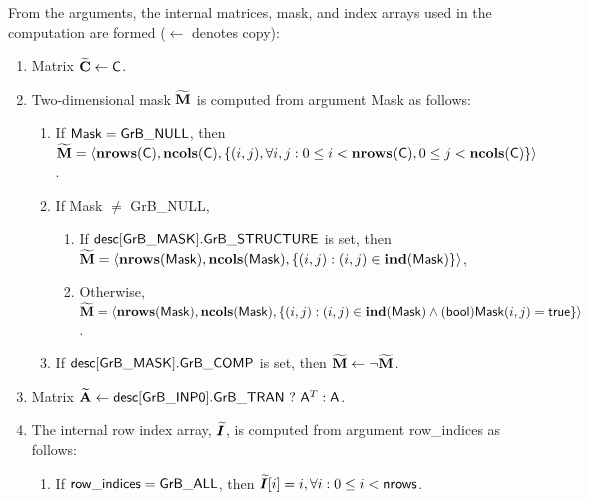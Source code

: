 From the arguments, the internal matrices, mask, and index arrays used in 
the computation are formed ($\leftarrow$ denotes copy):
\begin{enumerate}
	\item Matrix ${\bf \widetilde{C}} \leftarrow {\sf C}$.

	\item Two-dimensional mask ${\bf \widetilde{M}}$ is computed from
    argument {\sf Mask} as follows:
	\begin{enumerate}
		\item If ${\sf Mask} = {\sf GrB\_NULL}$, then ${\bf \widetilde{M}} = 
        \langle \bold{nrows}({\sf C}), \bold{ncols}({\sf C}), \{(i,j), 
        \forall i,j : 0 \leq i <  \bold{nrows}({\sf C}), 0 \leq j < 
        \bold{ncols}({\sf C}) \} \rangle$.

		\item If {\sf Mask} $\ne$ {\sf GrB\_NULL},
        \begin{enumerate}
            \item If ${\sf desc[GrB\_MASK].GrB\_STRUCTURE}$ is set, then 
            ${\bf \widetilde{M}} = \langle \bold{nrows}({\sf Mask}), 
            \bold{ncols}({\sf Mask}), \{(i,j) : (i,j) \in \bold{ind}({\sf Mask}) \} \rangle$,
            \item Otherwise, ${\bf \widetilde{M}} = \langle \bold{nrows}({\sf Mask}), 
            \bold{ncols}({\sf Mask}), \\ \{(i,j) : (i,j) \in \bold{ind}({\sf Mask}) \wedge 
            ({\sf bool}){\sf Mask}(i,j) = {\sf true}\} \rangle$.
        \end{enumerate}

		\item	If ${\sf desc[GrB\_MASK].GrB\_COMP}$ is set, then 
        ${\bf \widetilde{M}} \leftarrow \neg {\bf \widetilde{M}}$.
	\end{enumerate}

	\item Matrix ${\bf \widetilde{A}} \leftarrow
    {\sf desc[GrB\_INP0].GrB\_TRAN} \ ? \ {\sf A}^T : {\sf A}$.

    \item The internal row index array, $\bm{\widetilde{I}}$, is computed from 
    argument {\sf row\_indices} as follows:
	\begin{enumerate}
		\item	If ${\sf row\_indices} = {\sf GrB\_ALL}$, then 
        $\bm{\widetilde{I}}[i] = i, \forall i : 0 \leq i < {\sf nrows}$.


\end{enumerate}
\end{enumerate}
